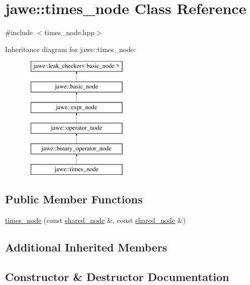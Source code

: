 \hypertarget{classjawe_1_1times__node}{}\section{jawe\+:\+:times\+\_\+node Class Reference}
\label{classjawe_1_1times__node}


{\ttfamily \#include $<$times\+\_\+node.\+hpp$>$}

Inheritance diagram for jawe\+:\+:times\+\_\+node\+:\begin{figure}[H]
\begin{center}
\leavevmode
\includegraphics[height=6.000000cm]{classjawe_1_1times__node}
\end{center}
\end{figure}
\subsection*{Public Member Functions}
\begin{DoxyCompactItemize}
\item 
\hyperlink{classjawe_1_1times__node_a2b38cb455ce8b3476d1b783b79adc7dc}{times\+\_\+node} (const \hyperlink{namespacejawe_a3f307481d921b6cbb50cc8511fc2b544}{shared\+\_\+node} \&, const \hyperlink{namespacejawe_a3f307481d921b6cbb50cc8511fc2b544}{shared\+\_\+node} \&)
\end{DoxyCompactItemize}
\subsection*{Additional Inherited Members}


\subsection{Constructor \& Destructor Documentation}
\mbox{\label{classjawe_1_1times__node_a2b38cb455ce8b3476d1b783b79adc7dc}} 
